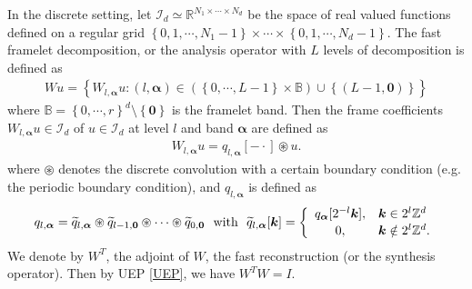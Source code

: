 \documentclass[reqno]{siamonline1116}
\numberwithin{theorem}{section}
\numberwithin{equation}{section}
\def\R{{\mathbb R}}
\def\Z{{\mathbb Z}}
\def\BB{{\mathbb B}}
\def\bk{{\boldsymbol k}}
\def\mI{{\mathcal I}}
\def\aal{\boldsymbol{\alpha}}
\def\0{{\mathbf 0}}
\def\wt{\widetilde}
\begin{document}
In the discrete setting, let $\mI_d\simeq\R^{N_1\times\cdots\times N_d}$ be the space of real valued functions defined on a regular grid $\left\{0,1,\cdots,N_1-1\right\}\times\cdots\times\left\{0,1,\cdots,N_d-1\right\}$. The fast framelet decomposition, or the analysis operator with $L$ levels of decomposition is defined as
\begin{align}
Wu=\left\{W_{l,\aal}u:(l,\aal)\in\left(\left\{0,\cdots,L-1\right\}\times\BB\right)\cup\left\{(L-1,\0)\right\}\right\}
\end{align}
where $\BB=\left\{0,\cdots,r\right\}^d\setminus\left\{\0\right\}$ is the framelet band. Then the frame coefficients $W_{l,\aal}u\in\mI_d$ of $u\in\mI_d$ at level $l$ and band $\aal$ are defined as
\begin{align*}
W_{l,\aal}u=q_{l,\aal}[-\cdot]\circledast u.
\end{align*}
where $\circledast$ denotes the discrete convolution with a certain boundary condition (e.g. the periodic boundary condition), and $q_{l,\aal}$ is defined as
\begin{align}
q_{l,\aal}=\wt{q}_{l,\aal}\circledast\wt{q}_{l-1,\0}\circledast\cdots\circledast\wt{q}_{0,\0}~~\text{with}~~\wt{q}_{l,\aal}[\bk]=\left\{\begin{array}{cl}
q_{\aal}[2^{-l}\bk],&\bk\in 2^l\Z^d\vspace{0.125em}\\
0,&\bk\notin 2^l\Z^d.
\end{array}\right.
\end{align}
We denote by $W^T$, the adjoint of $W$, the fast reconstruction (or the synthesis operator). Then by UEP \cref{UEP}, we have $W^TW=I$.
\end{document}
